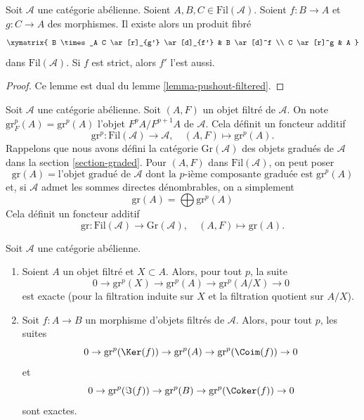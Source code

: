\begin{lemma}
\label{lemma-fibre-product-filtered}
Soit $\mathcal{A}$ une catégorie abélienne.
Soient $A, B, C \in \text{Fil}(\mathcal{A})$.
Soient $f : B \to A$ et $g : C \to A$ des morphismes.
Il existe alors un produit fibré
$$
\xymatrix{
B \times_A C \ar[r]_{g'} \ar[d]_{f'} & B \ar[d]^f \\
C \ar[r]^g & A
}
$$
dans $\text{Fil}(\mathcal{A})$. Si $f$ est strict, alors $f'$ l'est aussi.
\end{lemma}

\begin{proof}
Ce lemme est dual du
lemme \ref{lemma-pushout-filtered}.
\end{proof}

\noindent
Soit $\mathcal{A}$ une catégorie abélienne. Soit $(A, F)$ un objet
filtré de $\mathcal{A}$. On note $\text{gr}^p_F(A) = \text{gr}^p(A)$
l'objet $F^pA/F^{p + 1}A$ de $\mathcal{A}$. Cela définit un
foncteur additif
$$
\text{gr}^p :
\text{Fil}(\mathcal{A})
\longrightarrow
\mathcal{A}, \quad
(A, F)
\longmapsto
\text{gr}^p(A).
$$
Rappelons que nous avons défini la catégorie $\text{Gr}(\mathcal{A})$
des objets gradués de $\mathcal{A}$ dans la section \ref{section-graded}.
Pour $(A, F)$ dans $\text{Fil}(\mathcal{A})$, on peut poser
$$
\text{gr}(A) = \text{l'objet gradué de }\mathcal{A}\text{ dont la }
p\text{-ième composante graduée est }\text{gr}^p(A)
$$
et, si $\mathcal{A}$ admet les sommes directes dénombrables, on a simplement
$$
\text{gr}(A) = \bigoplus \text{gr}^p(A)
$$
Cela définit un foncteur additif
$$
\text{gr} :
\text{Fil}(\mathcal{A})
\longrightarrow
\text{Gr}(\mathcal{A}), \quad
(A, F) \longmapsto \text{gr}(A).
$$

\begin{lemma}
\label{lemma-ses-gr}
Soit $\mathcal{A}$ une catégorie abélienne.
\begin{enumerate}
\item Soient $A$ un objet filtré et $X \subset A$. Alors, pour tout $p$,
la suite
$$
0 \to \text{gr}^p(X) \to \text{gr}^p(A) \to \text{gr}^p(A/X) \to 0
$$
est exacte (pour la filtration induite sur $X$ et la filtration quotient sur $A/X$).
\item Soit $f : A \to B$ un morphisme d'objets filtrés de $\mathcal{A}$.
Alors, pour tout $p$, les suites
$$
0 \to \text{gr}^p(\Ker(f)) \to \text{gr}^p(A) \to
\text{gr}^p(\Coim(f)) \to 0
$$
et
$$
0 \to \text{gr}^p(\Im(f)) \to \text{gr}^p(B) \to
\text{gr}^p(\Coker(f)) \to 0
$$
sont exactes.
\end{enumerate}
\end{lemma}

